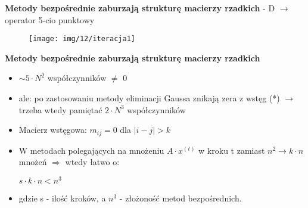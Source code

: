 \begin{frame}{}
  \textbf{Metody bezpośrednie zaburzają strukturę macierzy rzadkich}
   - D $\rightarrow$ operator 5-cio punktowy
  \begin{figure}
    \centering
    \texttt{[image: img/12/iteracja1]}
  \end{figure}
\end{frame}

\begin{frame}{}
  \begin{block}{\textbf{Metody bezpośrednie zaburzają strukturę macierzy rzadkich}}
    \begin{itemize}
      \item{$\sim 5 \cdot N^2$ współczynników $\neq$ 0}
      \item{ale: po zastosowaniu metody eliminacji Gaussa znikają zera z wstęg
      \newline (*) $\rightarrow$ trzeba wtedy pamiętać $2 \cdot N^3$ współczynników}
      \item{Macierz wstęgowa: $m_{ij}=0$ dla $|i-j|>k$}
      \item W metodach polegających na mnożeniu $A \cdot x^{(t)}$ w kroku t zamiast $n^2 \rightarrow k \cdot n$ mnożeń $\Rightarrow$ wtedy łatwo o:
      \begin{center}
      $s \cdot k \cdot n<n^3$ %
      \end{center}
      \item gdzie s - ilość kroków, a $n^3$ - złożoność metod bezpośrednich.
    \end{itemize}
  \end{block}
\end{frame}
